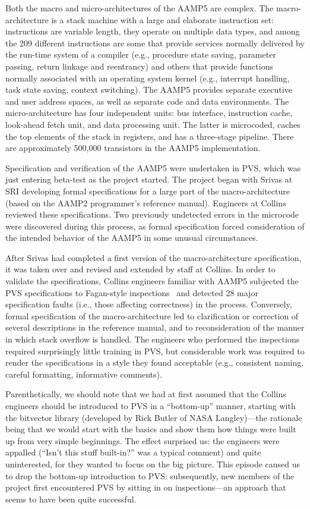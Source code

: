 Both the macro and micro-architectures of the AAMP5 are complex.  The
macro-architecture is a stack machine with a large and elaborate
instruction set: instructions are variable length, they operate on multiple
data types, and among the 209 different instructions are some that
provide services normally delivered by the run-time system of a
compiler (e.g., procedure state saving, parameter passing, return
linkage and reentrancy) and others that provide functions normally
associated with an operating system kernel (e.g., interrupt handling, task
state saving, context switching).  The AAMP5 provides separate
executive and user address spaces, as well as separate code and data
environments.  The micro-architecture has four independent units: bus
interface, instruction cache, look-ahead fetch unit, and data
processing unit.  The latter is microcoded, caches the top elements of
the stack in registers, and has a three-stage pipeline.  There are
approximately 500,000 transistors in the AAMP5 implementation.

Specification and verification of the AAMP5 were undertaken in PVS,
which was just entering beta-test as the project started.  The project
began with Srivas at SRI developing formal specifications for a large
part of the macro-architecture (based on the AAMP2 programmer's
reference manual).  Engineers at Collins reviewed these
specifications.  Two previously undetected errors in the microcode
were discovered during this process, as formal specification forced
consideration of the intended behavior of the AAMP5 in some unusual
circumstances.

After Srivas had completed a first version of the macro-architecture
specification, it was taken over and revised and extended by staff at
Collins.  In order to validate the specifications, Collins engineers
familiar with AAMP5 subjected the PVS specifications to Fagan-style
inspections~\cite{Gilb93} and detected 28 major specification faults
(i.e., those
affecting correctness) in the process.  Conversely, formal
specification of the macro-architecture led to clarification or
correction of several descriptions in the reference manual, and to
reconsideration of the manner in which stack overflow is handled.
The engineers who performed the inspections required surprisingly
little training in PVS, but considerable work was required to render
the specifications in a style they found acceptable (e.g., consistent
naming, careful formatting, informative comments).

Parenthetically, we should note that we had at first assumed that the
Collins engineers should be introduced to PVS in a ``bottom-up''
manner, starting with the bitvector library (developed by Rick
Butler of NASA Langley)---the rationale being that we would start
with the basics and show them how things were built up from very
simple beginnings.  The effect surprised us: the engineers were
appalled (``Isn't this stuff built-in?'' was a typical comment) and
quite uninterested, for they wanted to focus on the big picture.
This episode caused us to drop the bottom-up introduction to PVS:
subsequently, new members of the project first encountered PVS by
sitting in on inspections---an approach that seems to have been
quite successful.


